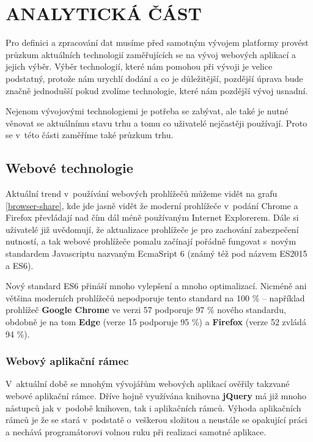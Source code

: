 \chapter{ANALYTICKÁ ČÁST} \label{analyza}
\par Pro definici a zpracování dat musíme před samotným vývojem platformy provést průzkum aktuálních technologií zaměřujících se na vývoj webových aplikací a jejich výběr. Výběr technologií, které nám pomohou při vývoji je velice podstatný, protože nám urychlí dodání a co je důležitější, pozdější úprava bude značně jednodušší pokud zvolíme technologie, které nám pozdější vývoj usnadní.

\par Nejenom vývojovými technologiemi je potřeba se zabývat, ale také je nutné věnovat se aktuálnímu stavu trhu a tomu co uživatelé nejčastěji používají. Proto se v~této části zaměříme také průzkum trhu.

\section{Webové technologie}
\par Aktuální trend v~používání webových prohlížečů můžeme vidět na grafu \ref{browser-share}, kde jde jasně vidět že moderní prohlížeče v~podání Chrome a Firefox převládají nad čím dál méně používaným Internet Explorerem. Dále si uživatelé již uvědomují, že aktualizace prohlížeče je pro zachování zabezpečení nutností, a tak webové prohlížeče pomalu začínají pořádně fungovat s~novým standardem Javascriptu nazvaným EcmaSript 6 (známý též pod názvem ES2015 a ES6). \cite{es6}

\par Nový standard ES6 přináší mnoho vylepšení a mnoho optimalizací. Nicméně ani většina moderních prohlížečů nepodporuje tento standard na 100 \% -- například prohlížeč \textbf{Google Chrome} ve verzi 57 podporuje 97 \% nového standardu, obdobně je na tom \textbf{Edge} (verze 15 podporuje 95 \%) a \textbf{Firefox} (verze 52 zvládá 94 \%). \cite{es6-coverage}

\subsection{Webový aplikační rámec}
\par V~aktuální době se mnohým vývojářům webových aplikací ověřily takzvané webové aplikační rámce. Dříve hojně využívána knihovna \textbf{jQuery} má již mnoho nástupců jak v~podobě knihoven, tak i aplikačních rámců. Výhoda aplikačních rámců je že se stará v~podstatě o~veškerou složitou a neustále se opakující práci a nechává programátorovi volnou ruku při realizaci samotné aplikace. \cite{framework}


